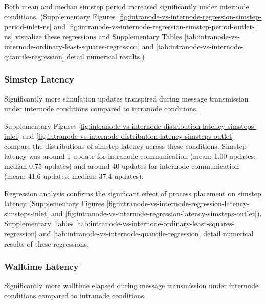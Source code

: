 Both mean and median simstep period increased significantly under internode conditions.
(Supplementary Figures \ref{fig:intranode-vs-internode-regression-simstep-period-inlet-ns} and \ref{fig:intranode-vs-internode-regression-simstep-period-outlet-ns} visualize these regressions and Supplementary Tables \ref{tab:intranode-vs-internode-ordinary-least-squares-regression} and \ref{tab:intranode-vs-internode-quantile-regression} detail numerical results.)

\subsubsection{Simstep Latency}

Significantly more simulation updates transpired during message transmission under internode conditions compared to intranode conditions.

Supplementary Figures \ref{fig:intranode-vs-internode-distribution-latency-simsteps-inlet} and \ref{fig:intranode-vs-internode-distribution-latency-simsteps-outlet} compare the distributions of simstep latency across these conditions.
Simstep latency was around 1 update for intranode communication (mean: 1.00 updates; median 0.75 updates) and around 40 updates for internode communication (mean: 41.6 updates; median: 37.4 updates).

Regression analysis confirms the significant effect of process placement on simstep latency (Supplementary Figures \ref{fig:intranode-vs-internode-regression-latency-simsteps-inlet} and \ref{fig:intranode-vs-internode-regression-latency-simsteps-outlet}).
Supplementary Tables \ref{tab:intranode-vs-internode-ordinary-least-squares-regression} and \ref{tab:intranode-vs-internode-quantile-regression} detail numerical results of these regressions.

\subsubsection{Walltime Latency}

Significantly more walltime elapsed during message transmission under internode conditions compared to intranode conditions.

